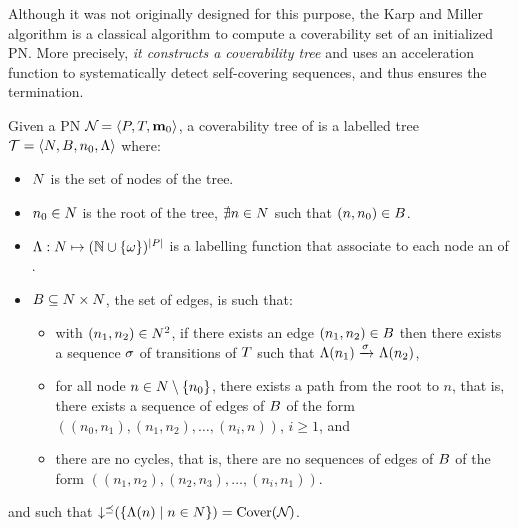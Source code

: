Although it was not originally designed for this purpose, the Karp and Miller algorithm \cite{Karp69} is a classical algorithm to compute a coverability set of an initialized \ac{PN}.
More precisely, \emph{it constructs a coverability tree} and uses an acceleration function to systematically detect self-covering sequences, and thus ensures the termination.

\begin{defi}
  Given a \ac{PN} $\defPN$, a coverability tree \nameT of \namePN is a labelled tree $\mathcal{T} = \left\langle N, B, n_0, \operatorname{\Lambda}\right\rangle$ where:
  \begin{itemize}
    \item $N$ is the set of nodes of the tree.%

    \item $n_0 \in N$ is the root of the tree, \ie $\nexists n \in N$ such that $(n, n_0) \in B$.

    \item $\operatorname{\Lambda} : N \mapsto (\mathbb{N} \cup \{\omega\})^{\left|P\right|}$ is a labelling function that associate to each node an \omark of \namePN.

    \item $B \subseteq N \times N$, the set of edges, is such that:
      \begin{itemize}
        \item with $(n_1, n_2) \in N^2$, if there exists an edge $(n_1, n_2) \in B$ then there exists a sequence $\seqt$ of transitions of $T$ such that $\lab{n_1} \fire{\seqt} \lab{n_2}$,
        \item for all node $n \in N \setminus \{n_0\}$, there exists a path from the root to $n$, that is, there exists a sequence of edges of $B$ of the form $((n_0, n_1), (n_1, n_2), \dots, (n_{i}, n))$, $i \geq 1$, and
        \item there are no cycles, that is, there are no sequences of edges of $B$ of the form $((n_1, n_2), (n_2, n_3), \dots, (n_i, n_1))$.
      \end{itemize}
  \end{itemize}
  and such that $\operatorname{\downarrow^\preceq}(\left\{\operatorname{\Lambda}(n) \mid n \in N\right\}) = \operatorname{Cover}(\mathcal{N}_{})$.
\end{defi}

